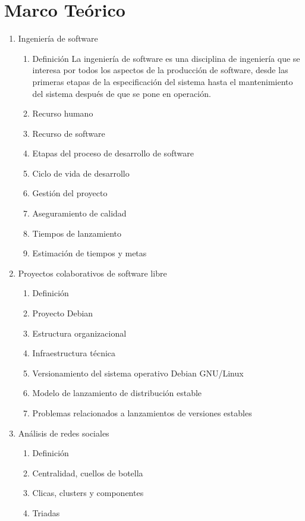\documentclass[12pt,titlepage]{report}
\begin{document}
\chapter{Marco Teórico}
\begin{enumerate}
\item Ingeniería de software
  \begin{enumerate}
  \item Definición La ingeniería de software es una disciplina de
    ingeniería que se interesa por todos los aspectos de la producción
    de software, desde las primeras etapas de la especificación del
    sistema hasta el mantenimiento del sistema después de que se pone
    en operación.\cite{9786073206037}
  \item Recurso humano
  \item Recurso de software
  \item Etapas del proceso de desarrollo de software
  \item Ciclo de vida de desarrollo
  \item Gestión del proyecto
  \item Aseguramiento de calidad
  \item Tiempos de lanzamiento
  \item Estimación de tiempos y metas
  \end{enumerate}
\item Proyectos colaborativos de software libre
  \begin{enumerate}
  \item Definición
  \item Proyecto Debian
  \item Estructura organizacional
  \item Infraestructura técnica
  \item Versionamiento del sistema operativo Debian GNU/Linux
  \item Modelo de lanzamiento de distribución estable
  \item Problemas relacionados a lanzamientos de versiones estables
  \end{enumerate}
\item Análisis de redes sociales
  \begin{enumerate}
  \item Definición
  \item Centralidad, cuellos de botella
  \item Clicas, clusters y componentes
  \item Triadas
  \end{enumerate}

\end{enumerate}
\end{document}
